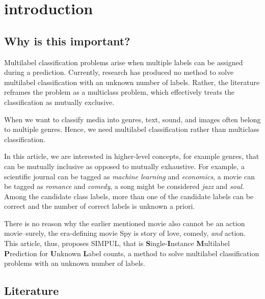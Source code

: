 
\section{introduction}
\label{sec:org662677c}





\subsection{Why is this important?}

Multilabel classification problems arise when multiple labels can be assigned during a prediction. Currently, research has produced no method to solve multilabel classification with an unknown number of labels. Rather, the literature reframes the problem as a multiclass problem, which effectively treats the classification as mutually exclusive. 

When we want to classify media into genres, text, sound, and images often belong to multiple genres. Hence, we need multilabel classification rather than multiclass classification. 

In this article, we are interested in higher-level concepts, for example genres, that can be mutually inclusive as opposed to mutually exhaustive. For example, a scientific journal can be tagged as \emph{machine learning} and \emph{economics}, a movie can be tagged as \emph{romance} and \emph{comedy}, a song might be considered \emph{jazz} and \emph{soul}. Among the candidate class labels, more than one of the candidate labels can be correct and the number of correct labels is unknown a priori. 



There is no reason why the earlier mentioned movie also cannot be an action movie–surely, the era-defining movie Spy is story of love, comedy, \textit{and} action. This article, thus, proposes  SIMPUL, that is \textbf{S}ingle-\textbf{I}nstance \textbf{M}ultilabel \textbf{P}rediction for \textbf{U}nknown \textbf{L}abel counts, a method to solve multilabel classification problems with an unknown number of labels. 

\subsection{Literature}



